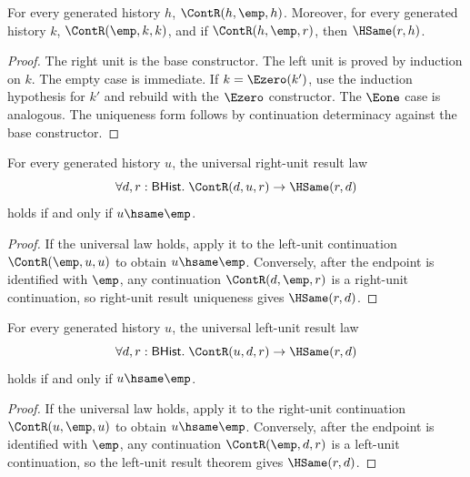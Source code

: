 \begin{theorem}
\label{thm:continuation-unit-laws-spine}
For every generated history $h$, $\ContR(h,\emp,h)$. Moreover, for every generated history $k$, $\ContR(\emp,k,k)$, and if $\ContR(h,\emp,r)$, then $\HSame(r,h)$.
\end{theorem}
\begin{proof}
The right unit is the base constructor. The left unit is proved by induction on $k$. The empty case is immediate. If $k=\Ezero(k')$, use the induction hypothesis for $k'$ and rebuild with the $\Ezero$ constructor. The $\Eone$ case is analogous. The uniqueness form follows by continuation determinacy against the base constructor.
\end{proof}

\begin{theorem}
\label{thm:cont-right-unit-law-endpoint-empty-iff}
For every generated history $u$, the universal right-unit result law
$$
\forall d,r:\mathsf{BHist}.\; \ContR(d,u,r)\to \HSame(r,d)
$$
holds if and only if $u\hsame\emp$.
\end{theorem}
\begin{proof}
If the universal law holds, apply it to the left-unit continuation
$\ContR(\emp,u,u)$ to obtain $u\hsame\emp$. Conversely, after the endpoint is
identified with $\emp$, any continuation $\ContR(d,\emp,r)$ is a right-unit
continuation, so right-unit result uniqueness gives $\HSame(r,d)$.
\end{proof}

\begin{theorem}
\label{thm:cont-left-unit-law-endpoint-empty-iff}
For every generated history $u$, the universal left-unit result law
$$
\forall d,r:\mathsf{BHist}.\; \ContR(u,d,r)\to \HSame(r,d)
$$
holds if and only if $u\hsame\emp$.
\end{theorem}
\begin{proof}
If the universal law holds, apply it to the right-unit continuation
$\ContR(u,\emp,u)$ to obtain $u\hsame\emp$. Conversely, after the endpoint is
identified with $\emp$, any continuation $\ContR(\emp,d,r)$ is a left-unit
continuation, so the left-unit result theorem gives $\HSame(r,d)$.
\end{proof}

